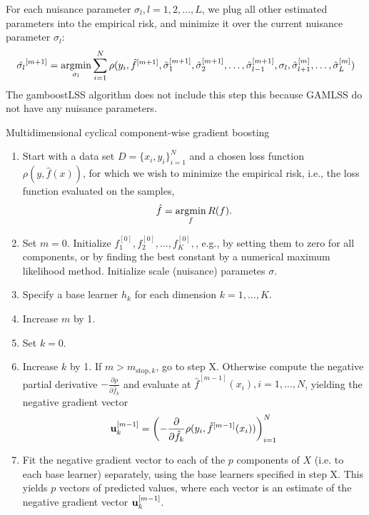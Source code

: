 For each nuisance parameter $\sigma_l, l=1,2,\ldots,L$, we plug all other estimated parameters into the empirical risk, and minimize it over the current nuisance parameter $\sigma_l$:
\begin{equation}
    \hat{\sigma_l}^{[m+1]}=\operatorname*{argmin}_{\sigma_l} \sum_{i=1}^N \rho(y_i,\hat{f}^{[m+1]},\hat{\sigma}_1^{[m+1]},\hat{\sigma}_2^{[m+1]},\ldots,
    \hat{\sigma}_{l-1}^{[m+1]},\sigma_l,\hat{\sigma}_{l+1}^{[m]},\ldots,\hat{\sigma}_L^{[m]})
\end{equation}
The gamboostLSS algorithm \citep{gamboostlss-paper} does not include this step this because GAMLSS do not have any nuisance parameters.
\begin{algorithm}
\caption{Multidimensional cyclical component-wise gradient boosting}
\label{algo:multi-cyclical}
\begin{enumerate}
    \item Start with a data set $D=\{x_i, y_i\}_{i=1}^N$ and a chosen loss function $\rho(y,\hat{f}(x))$, for which we wish to
        minimize the empirical risk, i.e., the loss function evaluated on the samples,
        \begin{equation}
            \hat{f}=\operatorname*{argmin}_{f}R(f).
        \end{equation}
    \item Set $m=0$. Initialize $f^{[0]}_1,f^{[0]}_2,\ldots,f^{[0]}_K,$, e.g., by setting them to zero for all components, or by finding the best constant by a numerical maximum likelihood method. Initialize scale (nuisance) parametes $\sigma$.
    \item Specify a base learner $h_k$ for each dimension $k=1,\ldots,K$.
    \item Increase $m$ by 1.
    \item Set $k=0$.
    \item Increase $k$ by 1. If $m>m_{\text{stop},k}$, go to step X. Otherwise compute the negative partial derivative
        $-\frac{\partial\rho}{\partial \hat{f}_k}$ and evaluate at $\hat{f}^{[m-1]}(x_i),i=1,\ldots,N$, yielding the
        negative gradient vector
        \begin{equation}
            \mathbf{u}^{[m-1]}_k=\left(-\frac{\partial}{\partial \hat{f}_k}\rho(y_i, \hat{f}^{[m-1]}(x_i))\right)_{i=1}^N
        \end{equation}
    \item Fit the negative gradient vector to each of the $p$ components of $X$ (i.e. to each base learner) separately, using the base learners specified in step X. This yields $p$ vectors of predicted values, where each vector is an estimate of the negative gradient vector $\mathbf{u}^{[m-1]}_k$.

\end{enumerate}
\end{algorithm}
